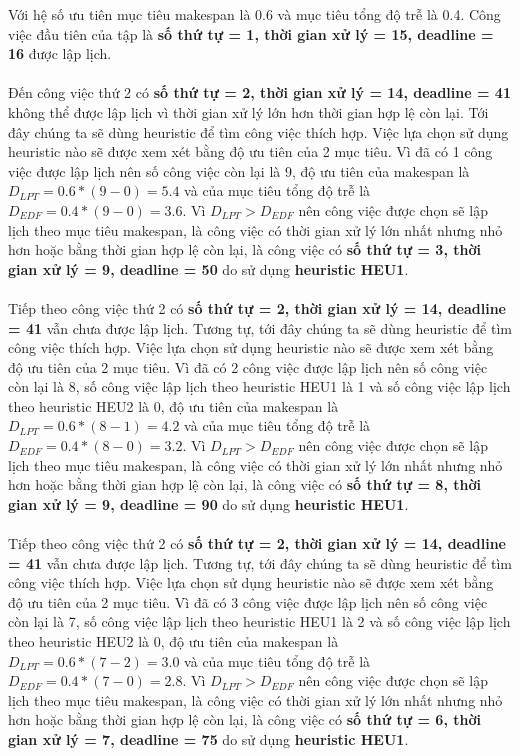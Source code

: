 \documentclass[a4paper,12pt]{article}
\begin{document}
Với hệ số ưu tiên mục tiêu makespan là 0.6 và mục tiêu tổng độ trễ là 0.4. Công việc đầu tiên của tập là \textbf{số thứ tự = 1, thời gian xử lý = 15, deadline = 16} được lập lịch.\\\\
Đến công việc thứ 2 có \textbf{số thứ tự = 2, thời gian xử lý = 14, deadline = 41} không thể được lập lịch vì thời gian xử lý lớn hơn thời gian hợp lệ còn lại. Tới đây chúng ta sẽ dùng heuristic để tìm công việc thích hợp. Việc lựa chọn sử dụng heuristic nào sẽ được xem xét bằng độ ưu tiên của 2 mục tiêu. Vì đã có 1 công việc được lập lịch nên số công việc còn lại là 9, độ ưu tiên của makespan là $D_{LPT} = 0.6*(9 - 0) = 5.4$ và của mục tiêu tổng độ trễ là $D_{EDF} = 0.4*(9 - 0) = 3.6$. Vì $D_{LPT} > D_{EDF}$ nên công việc được chọn sẽ lập lịch theo mục tiêu makespan, là công việc có thời gian xử lý lớn nhất nhưng nhỏ hơn hoặc bằng thời gian hợp lệ còn lại, là công việc có \textbf{số thứ tự = 3, thời gian xử lý = 9, deadline = 50} do sử dụng \textbf{heuristic HEU1}.\\\\
Tiếp theo công việc thứ 2 có \textbf{số thứ tự = 2, thời gian xử lý = 14, deadline = 41} vẫn chưa được lập lịch. Tương tự, tới đây chúng ta sẽ dùng heuristic để tìm công việc thích hợp. Việc lựa chọn sử dụng heuristic nào sẽ được xem xét bằng độ ưu tiên của 2 mục tiêu. Vì đã có 2 công việc được lập lịch nên số công việc còn lại là 8, số công việc lập lịch theo heuristic HEU1 là 1 và số công việc lập lịch theo heuristic HEU2 là 0, độ ưu tiên của makespan là $D_{LPT} = 0.6*(8 - 1) = 4.2$ và của mục tiêu tổng độ trễ là $D_{EDF} = 0.4*(8 - 0) = 3.2$. Vì $D_{LPT} > D_{EDF}$ nên công việc được chọn sẽ lập lịch theo mục tiêu makespan, là công việc có thời gian xử lý lớn nhất nhưng nhỏ hơn hoặc bằng thời gian hợp lệ còn lại, là công việc có \textbf{số thứ tự = 8, thời gian xử lý = 9, deadline = 90} do sử dụng \textbf{heuristic HEU1}.\\\\
Tiếp theo công việc thứ 2 có \textbf{số thứ tự = 2, thời gian xử lý = 14, deadline = 41} vẫn chưa được lập lịch. Tương tự, tới đây chúng ta sẽ dùng heuristic để tìm công việc thích hợp. Việc lựa chọn sử dụng heuristic nào sẽ được xem xét bằng độ ưu tiên của 2 mục tiêu. Vì đã có 3 công việc được lập lịch nên số công việc còn lại là 7, số công việc lập lịch theo heuristic HEU1 là 2 và số công việc lập lịch theo heuristic HEU2 là 0, độ ưu tiên của makespan là $D_{LPT} = 0.6*(7 - 2) = 3.0$ và của mục tiêu tổng độ trễ là $D_{EDF} = 0.4*(7 - 0) = 2.8$. Vì $D_{LPT} > D_{EDF}$ nên công việc được chọn sẽ lập lịch theo mục tiêu makespan, là công việc có thời gian xử lý lớn nhất nhưng nhỏ hơn hoặc bằng thời gian hợp lệ còn lại, là công việc có \textbf{số thứ tự = 6, thời gian xử lý = 7, deadline = 75} do sử dụng \textbf{heuristic HEU1}.\\\\
\end{document}
